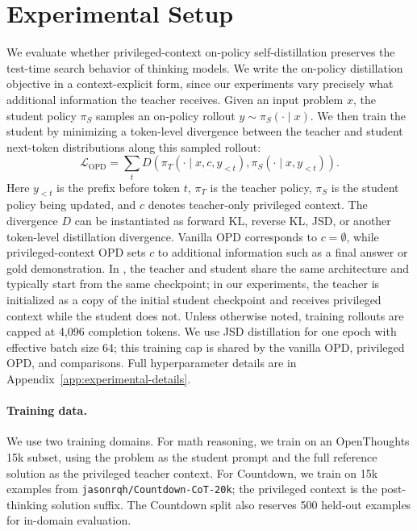 \section{Experimental Setup}
\label{sec:method}

We evaluate whether privileged-context on-policy self-distillation preserves the
test-time search behavior of thinking models. We write the on-policy
distillation objective in a context-explicit form, since our experiments vary
precisely what additional information the teacher receives. Given an input
problem $x$, the student policy $\pi_S$ samples an on-policy rollout
$y \sim \pi_S(\cdot \mid x)$. We then train the student by minimizing a
token-level divergence between the teacher and student next-token distributions
along this sampled rollout:
\[
\mathcal{L}_{\mathrm{OPD}}
=
\sum_t
D\left(
\pi_T(\cdot \mid x, c, y_{<t}),
\pi_S(\cdot \mid x, y_{<t})
\right).
\]
Here $y_{<t}$ is the prefix before token $t$, $\pi_T$ is the teacher policy,
$\pi_S$ is the student policy being updated, and $c$ denotes teacher-only
privileged context. The divergence $D$ can be instantiated as forward KL,
reverse KL, JSD, or another token-level distillation divergence. Vanilla OPD
corresponds to $c=\emptyset$, while privileged-context OPD sets $c$ to
additional information such as a final answer or gold demonstration. In
\opsd{}, the teacher and student share the same architecture and typically start
from the same checkpoint; in our experiments, the teacher is initialized as a
copy of the initial student checkpoint and receives privileged context while the
student does not. Unless otherwise noted, training rollouts are capped at
4,096 completion tokens. We use JSD distillation for one epoch with effective
batch size 64; this training cap is shared by the vanilla OPD, privileged OPD,
and \opsd{} comparisons. Full hyperparameter details are in
Appendix~\ref{app:experimental-details}.

\paragraph{Training data.}
We use two training domains. For math reasoning, we train on an OpenThoughts
15k subset, using the problem as the student prompt and the full reference
solution as the privileged teacher context. For Countdown, we train on 15k
examples from \texttt{jasonrqh/Countdown-CoT-20k}; the privileged context is the
post-thinking solution suffix. The Countdown split also reserves 500 held-out
examples for in-domain evaluation.

